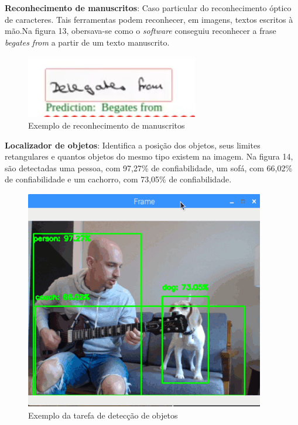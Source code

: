 \documentclass{article}
\begin{document}
\textbf{Reconhecimento de manuscritos}: Caso particular do reconhecimento óptico de caracteres. Tais ferramentas podem reconhecer, em imagens, textos escritos à mão.Na figura 13, obersava-se como o \textit{software} conseguiu reconhecer a frase \textit{begates from} a partir de um texto manuscrito.\\
\begin{figure}[H]
    \centering
    \includegraphics[scale=0.5]{imagens/handwritten.png}
    \caption{Exemplo de reconhecimento de manuscritos}
    \label{fig:manuscrito}
\end{figure}{}
\textbf{Localizador de objetos}: Identifica a posição dos objetos, seus limites retangulares e quantos objetos do mesmo tipo existem na imagem. Na figura 14, são detectadas uma pessoa, com 97,27\% de confiabilidade, um sofá, com 66,02\% de confiabilidade e um cachorro, com 73,05\% de confiabilidade. \\
\begin{figure}[H]
    \centering
    \includegraphics[scale=0.5]{imagens/deteccao_objetos.png}
    \caption{Exemplo da tarefa de detecção de objetos} %
    \label{fig:detecção_obetos}
\end{figure}
\end{document}
